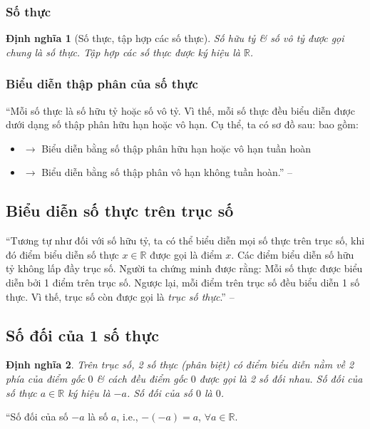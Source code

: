 \documentclass[oneside]{book}
\numberwithin{equation}{section}
\newtheorem{dinhnghia}{Định nghĩa}[section]
\begin{document}
\subsubsection{Số thực}

\begin{dinhnghia}[Số thực, tập hợp các số thực]
	Số hữu tỷ \& số vô tỷ được gọi chung là \emph{số thực}. \emph{Tập hợp các số thực} được ký hiệu là $\mathbb{R}$.
\end{dinhnghia}

\subsubsection{Biểu diễn thập phân của số thực}
``Mỗi số thực là số hữu tỷ hoặc số vô tỷ. Vì thế, mỗi số thực đều biểu diễn được dưới dạng số thập phân hữu hạn hoặc vô hạn. Cụ thể, ta có sơ đồ sau:  bao gồm:
\begin{itemize}
	\item {} $\to$ Biểu diễn bằng số thập phân hữu hạn hoặc vô hạn tuần hoàn
	\item {} $\to$ Biểu diễn bằng số thập phân vô hạn không tuần hoàn.'' -- \cite[p. 38]{SGK_Toan_7_Canh_Dieu_tap_1}
\end{itemize}

\subsection{Biểu diễn số thực trên trục số}
``Tương tự như đối với số hữu tỷ, ta có thể biểu diễn mọi số thực trên trục số, khi đó điểm biểu diễn số thực $x\in\mathbb{R}$ được gọi là điểm $x$. Các điểm biểu diễn số hữu tỷ không lấp đầy trục số. Người ta chứng minh được rằng: Mỗi số thực được biểu diễn bởi 1 điểm trên trục số. Ngược lại, mỗi điểm trên trục số đều biểu diễn 1 số thực. Vì thế, trục số còn được gọi là \textit{trục số thực}.'' -- \cite[p. 39]{SGK_Toan_7_Canh_Dieu_tap_1}

\subsection{Số đối của 1 số thực}

\begin{dinhnghia}
	Trên trục số, 2 số thực (phân biệt) có điểm biểu diễn nằm về 2 phía của điểm gốc $0$ \& cách đều điểm gốc $0$ được gọi là \emph{2 số đối nhau}. \emph{Số đối} của số thực $a\in\mathbb{R}$ ký hiệu là $-a$. Số đối của số $0$ là $0$.
\end{dinhnghia}
``Số đối của số $-a$ là số $a$, i.e., $-(-a) = a$, $\forall a\in\mathbb{R}$.
\end{document}
